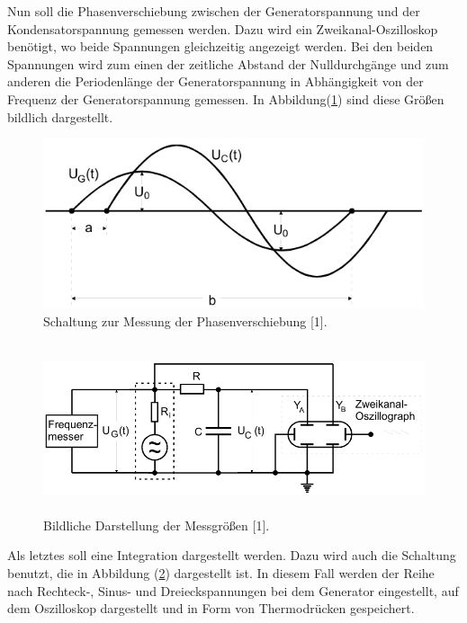 Nun soll die Phasenverschiebung zwischen der Generatorspannung und der Kondensatorspannung
gemessen werden. Dazu wird ein Zweikanal-Oszilloskop benötigt, wo beide Spannungen
gleichzeitig angezeigt werden. Bei den beiden Spannungen wird zum einen der
zeitliche Abstand der Nulldurchgänge und zum anderen die Periodenlänge der Generatorspannung
in Abhängigkeit von der Frequenz der Generatorspannung gemessen.
In Abbildung(\ref{fig:4}) sind diese Größen bildlich dargestellt.

\begin{figure}[H]
  \centering
  \includegraphics[height=5cm, width=\textwidth]{D4.png}
  \caption{Schaltung zur Messung der Phasenverschiebung [1].}
  \label{fig:4}
\end{figure}

\begin{figure}[H]
  \centering
  \includegraphics[height=5cm, width=\textwidth]{D3.png}
  \caption{Bildliche Darstellung der Messgrößen [1].}
  \label{fig:5}
\end{figure}

Als letztes soll eine Integration dargestellt werden. Dazu wird auch die Schaltung
benutzt, die in Abbildung (\ref{fig:5}) dargestellt ist. In diesem Fall werden der Reihe nach
Rechteck-, Sinus- und Dreieckspannungen bei dem Generator eingestellt, auf
dem Oszilloskop dargestellt und in Form von Thermodrücken gespeichert.
